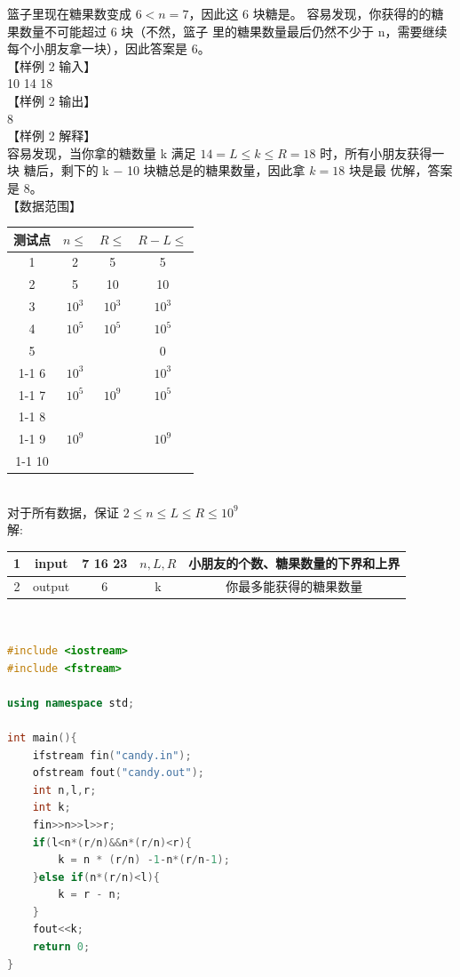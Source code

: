 \documentclass[12pt,twiside,a4paper]{ctexbook}
\numberwithin{chapter}{part}
\begin{document}
篮子里现在糖果数变成 $6 < n = 7$，因此这 6 块糖是。
容易发现，你获得的的糖果数量不可能超过 6 块（不然，篮子
里的糖果数量最后仍然不少于 n，需要继续每个小朋友拿一块），因此答案是 6。\\
【样例 2 输入】\\
10 14 18\\
【样例 2 输出】\\
8\\
【样例 2 解释】\\
容易发现，当你拿的糖数量 k 满足 $14 = L \leq k \leq R = 18$ 时，所有小朋友获得一块
糖后，剩下的 k − 10 块糖总是的糖果数量，因此拿 $k = 18$ 块是最
优解，答案是 8。\\
【数据范围】\\
\begin{tabular}{|c|c|c|c|}
  \hline
  测试点 &  $n\leq$ & $R\leq$ & $R-L\leq$\\
  \hline
  1 & 2 & 5 & 5\\
  \hline
  2 & 5 & 10 & 10\\
  \hline
  3 & $10^3$ & $10^3$ & $10^3$\\
  \hline
  4 & $10^5$ & $10^5$ & $10^5$\\
  \hline
  5 & & & 0\\
  \cline{1-1}
  \cline{4-1}
  6 & $10^3$ & & $10^3$\\
  \cline{1-1}
  \cline{2-1}
  \cline{4-1}
  7 & $10^5$ & $10^9$ & $10^5$\\
  \cline{1-1}
  \cline{2-1}
  \cline{4-1}
  8 & & & \\
  \cline{1-1}
  9 & $10^9$ & & $10^{9}$\\
  \cline{1-1}
  10 & & &\\
  \hline
\end{tabular}\\
对于所有数据，保证 $2 \leq n \leq L \leq R \leq 10^9$\\
解:\\
\begin{tabular}{|c|c|c|c|c|}
\hline
1 & input &7 16 23 & $n, L, R$ & 小朋友的个数、糖果数量的下界和上界\\
\hline
2 & output & 6 & k & 你最多能获得的糖果数量\\
\hline
\end{tabular}\\
\begin{lstlisting}[language=C++]
#include <iostream>
#include <fstream>

using namespace std;

int main(){
	ifstream fin("candy.in");
	ofstream fout("candy.out");
	int n,l,r;
	int k;
	fin>>n>>l>>r;
	if(l<n*(r/n)&&n*(r/n)<r){
		k = n * (r/n) -1-n*(r/n-1);
	}else if(n*(r/n)<l){
		k = r - n;
	}
	fout<<k;
	return 0;
}
\end{lstlisting}
\end{document}
